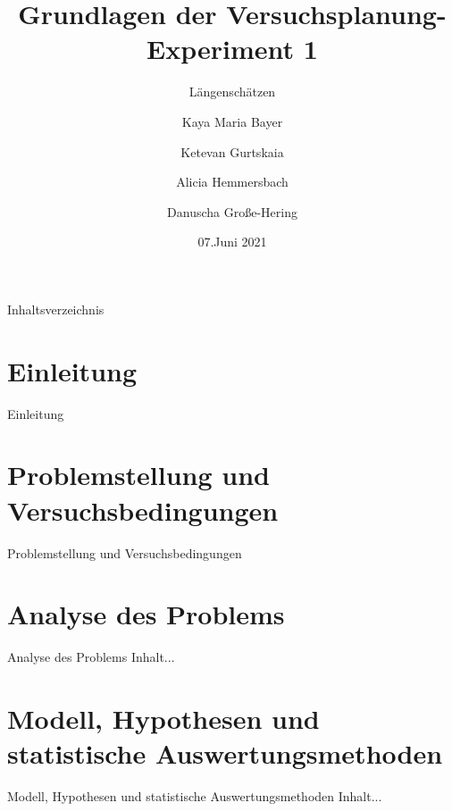 \documentclass[ ngerman, fontsize= 10pt, headings=big, titlepage=true]{beamer}
\title{Grundlagen der Versuchsplanung-Experiment 1}
\subtitle{Längenschätzen}
\author{Kaya Maria Bayer \and Ketevan Gurtskaia \and Alicia Hemmersbach \and Danuscha Große-Hering}
\date{07.Juni 2021}
\begin{document}
\begin{frame}[plain]
    \maketitle
\end{frame}

\begin{frame}{Inhaltsverzeichnis}
	\tableofcontents
\end{frame}

\section{Einleitung}
\begin{frame}{Einleitung}
\end{frame}

\section{Problemstellung und Versuchsbedingungen}
\begin{frame}{Problemstellung und Versuchsbedingungen}
	
\end{frame}

\section{Analyse des Problems}
\begin{frame}{Analyse des Problems}
	Inhalt...
\end{frame}

\section{Modell, Hypothesen und statistische Auswertungsmethoden}
\begin{frame}{Modell, Hypothesen und statistische Auswertungsmethoden}
	Inhalt...
\end{frame}
\end{document}
